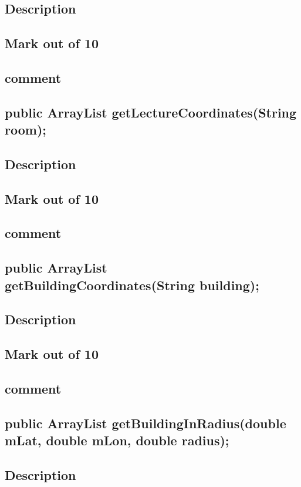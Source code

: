 \documentclass[12pt]{article}
\begin{document}
			\subsection{Description}
			\subsection{Mark out of 10}     
			\subsection{comment}                                                  
		\subsection{public ArrayList getLectureCoordinates(String room);     }         
			\subsection{Description}
			\subsection{Mark out of 10}     
			\subsection{comment}                                         
		\subsection	{public ArrayList getBuildingCoordinates(String building);         }        
			\subsection{Description}
			\subsection{Mark out of 10}     
			\subsection{comment}                                    
		\subsection{	public ArrayList getBuildingInRadius(double mLat, double mLon, double radius);  }    
			\subsection{Description}
\end{document}
